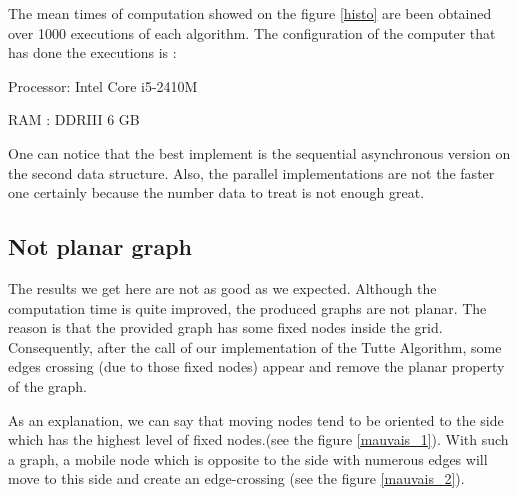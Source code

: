 The mean times of computation showed on the figure \ref{histo} are been
obtained over 1000 executions of each algorithm. The configuration of the
computer that has done the executions is :
\begin{description}
\item {Processor}: Intel Core i5-2410M
\item {RAM} : DDRIII 6 GB
\end{description}

One can notice that the best implement is the sequential asynchronous
version on the second data structure. Also, the parallel implementations
are not the faster one certainly because the number data to treat is not
enough great.

\subsection{Not planar graph}
The results we get here are not as good as we expected. Although the
computation time is quite improved, the produced graphs are not planar. The
reason is that the provided graph has some fixed nodes inside the
grid. Consequently, after the call of our implementation of the Tutte
Algorithm, some edges crossing (due to those fixed nodes) appear and remove
the planar property of the graph.

As an explanation, we can say that moving nodes tend to be oriented to the 
side which has the highest level of fixed nodes.(see the figure \ref{mauvais_1}). 
With such a graph, a mobile node which is opposite to the side with numerous
edges will move to this side and create an edge-crossing (see the figure \ref{mauvais_2}).


